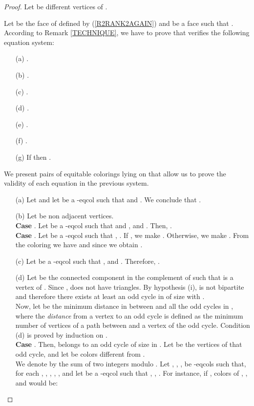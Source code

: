 \begin{proof}
Let  be different vertices of .

Let  be the face of  defined by (\ref{R2RANK2AGAIN}) and
 be a face such that .
According to Remark \ref{TECHNIQUE}, we have to prove that  verifies the following equation system: 
\begin{enumerate}
\item[(a)] .
\item[(b)] .
\item[(c)] .
\item[(d)] .
\item[(e)] .
\item[(f)] .
\item[(g)] If  then
           .
\end{enumerate}
We present pairs of equitable colorings lying on  that allow us to
prove the validity of each equation in the previous system.
\begin{enumerate}
\item[(a)] Let  and let  be a -eqcol such that
 and .
We conclude that .
\item[(b)] Let  be non adjacent vertices.\\
\textbf{Case }. Let  be a -eqcol such that  and ,
and . Then, .\\
\textbf{Case }. Let  be a -eqcol such that , . If , we make
. Otherwise, we make . From the coloring  we have
 and since  we obtain .
\item[(c)] Let  be a -eqcol such that ,  and .
Therefore, .
\item[(d)] Let  be the connected component in the complement of 
such that  is a vertex of . Since ,  does not have triangles.
By hypothesis (i),  is not bipartite and therefore there exists at least an odd cycle in  of size  with .\\
Now, let  be the minimum distance in  between  and all the odd cycles in , where the \emph{distance} from a vertex  to an odd cycle is defined as the minimum number of vertices of a path between  and a vertex of the odd cycle.
Condition (d) is proved by induction on .\\
\textbf{Case }. Then,  belongs to an odd cycle of size  in . Let  be the vertices of that odd cycle, and let 
be colors different from .\\
We denote by  the sum of two integers modulo .
Let , , ,  be -eqcols such that,
for each , , ,
, , and let
 be a -eqcol such that , , . For instance, if , colors of , ,  and  would be:
\begin{center} \small

\end{center}
\end{enumerate}
\end{proof}
